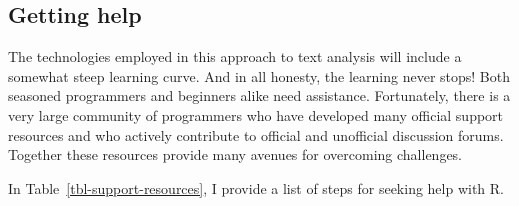\documentclass[
  letterpaper,
  krantz1]{latex/krantz-mod}
\theoremstyle{definition}
\theoremstyle{definition}
\theoremstyle{remark}
\begin{document}
\subsection*{Getting help}\label{sec-preface-getting-help}

The technologies employed in this approach to text analysis will include
a somewhat steep learning curve. And in all honesty, the learning never
stops! Both seasoned programmers and beginners alike need assistance.
Fortunately, there is a very large community of
programmers who have developed many official support resources and who
actively contribute to official and unofficial discussion forums.
Together these resources provide many avenues for overcoming challenges.

In Table~\ref{tbl-support-resources}, I provide a list of steps for
seeking help with R.
\end{document}
